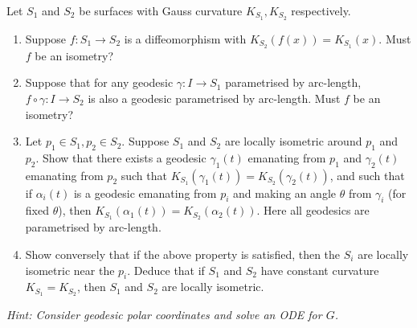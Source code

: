 \begin{problem}
\label{prob:cp-vii-0074}
Let $S_1$ and $S_2$ be surfaces with Gauss curvature $K_{S_1}, K_{S_2}$ respectively.
	\begin{enumerate}
		\item Suppose $f:S_1\to S_2$ is a diffeomorphism with $K_{S_2}(f(x))=K_{S_1}(x)$. Must $f$ be an isometry?
		\item Suppose that for any geodesic $\gamma:I\to S_1$ parametrised by arc-length, $f\circ\gamma:I\to S_2$ is also a geodesic
		parametrised by arc-length. Must $f$ be an isometry?
		\item Let $p_1\in S_1, p_2\in S_2$. Suppose $S_1$ and $S_2$ are locally isometric around $p_1$ and $p_2$.
		Show that there exists a geodesic $\gamma_1(t)$ emanating from $p_1$ and $\gamma_2(t)$ emanating from $p_2$ such that
		$K_{S_1}(\gamma_1(t))=K_{S_2}(\gamma_2(t))$, and such that if $\alpha_i(t)$ is a geodesic emanating from $p_i$ and making an
		angle $\theta$ from $\gamma_i$ (for fixed $\theta$), then $K_{S_1}(\alpha_1(t))=K_{S_2}(\alpha_2(t))$.
		Here all geodesics are parametrised by arc-length.
		\item Show conversely that if the above property is satisfied, then the $S_i$ are locally isometric near the $p_i$.
		Deduce that if $S_1$ and $S_2$ have constant curvature $K_{S_1}=K_{S_2}$, then $S_1$ and $S_2$ are locally isometric.
	\end{enumerate}
	\hfill\textit{Hint: Consider geodesic polar coordinates and solve an ODE for $G$.}
	
	\medskip
\end{problem}

